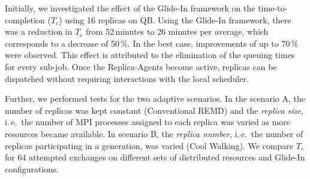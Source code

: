 \documentclass{rspublic}
\begin{document}
Initially, we investigated the effect of the 
Glide-In framework on the time-to-completion ($T_{c}$) using 16
replicas on QB.  Using the Glide-In framework, there was a reduction
in $T_{c}$ from 52\,minutes to 26 minutes per average, which
corresponds to a decrease of 50\,\%.  In the best case,
improvements of up to 70\,\% were observed. This effect
is attributed to the elimination of the queuing times for every
sub-job. Once the Replica-Agents become active, replicas can be
dispatched without requiring interactions with the local
scheduler.

Further, we performed tests for the two adaptive scenarios.
In the scenario A, the number of replicas was kept constant
(Conventional REMD) and the \emph{replica size}, i.\,e.\ the number of
MPI processes assigned to each replica was varied as more resources
became available.  In scenario B, the \emph{replica number}, i.\,e.\ the
number of replicas participating in a generation, was varied (Cool
Walking).  We compare $T_{c}$ for 64 attempted exchanges on different sets of
distributed resources and Glide-In configurations.
                    
\end{document}
